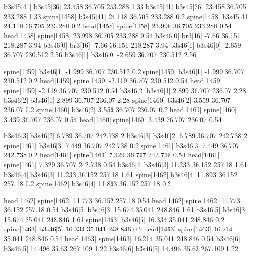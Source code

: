 b3s45[41]    b3s45[36]    23.458    36.705    233.288    1.33
b3s45[41]    b3s45[36]    23.458    36.705    233.288    1.33
spine[1458]    b3s45[41]    24.118    36.705    233.288    0.2
spine[1458]    b3s45[41]    24.118    36.705    233.288    0.2
head[1458]    spine[1458]    23.998    36.705    233.288    0.54
head[1458]    spine[1458]    23.998    36.705    233.288    0.54
b3s46[0]    br3[16]    -7.66    36.151    218.287    3.94
b3s46[0]    br3[16]    -7.66    36.151    218.287    3.94
b3s46[1]    b3s46[0]    -2.659    36.707    230.512    2.56
b3s46[1]    b3s46[0]    -2.659    36.707    230.512    2.56


spine[1459]    b3s46[1]    -1.999    36.707    230.512    0.2
spine[1459]    b3s46[1]    -1.999    36.707    230.512    0.2
head[1459]    spine[1459]    -2.119    36.707    230.512    0.54
head[1459]    spine[1459]    -2.119    36.707    230.512    0.54
b3s46[2]    b3s46[1]    2.899    36.707    236.07    2.28
b3s46[2]    b3s46[1]    2.899    36.707    236.07    2.28
spine[1460]    b3s46[2]    3.559    36.707    236.07    0.2
spine[1460]    b3s46[2]    3.559    36.707    236.07    0.2
head[1460]    spine[1460]    3.439    36.707    236.07    0.54
head[1460]    spine[1460]    3.439    36.707    236.07    0.54


b3s46[3]    b3s46[2]    6.789    36.707    242.738    2
b3s46[3]    b3s46[2]    6.789    36.707    242.738    2
spine[1461]    b3s46[3]    7.449    36.707    242.738    0.2
spine[1461]    b3s46[3]    7.449    36.707    242.738    0.2
head[1461]    spine[1461]    7.329    36.707    242.738    0.54
head[1461]    spine[1461]    7.329    36.707    242.738    0.54
b3s46[4]    b3s46[3]    11.233    36.152    257.18    1.61
b3s46[4]    b3s46[3]    11.233    36.152    257.18    1.61
spine[1462]    b3s46[4]    11.893    36.152    257.18    0.2
spine[1462]    b3s46[4]    11.893    36.152    257.18    0.2


head[1462]    spine[1462]    11.773    36.152    257.18    0.54
head[1462]    spine[1462]    11.773    36.152    257.18    0.54
b3s46[5]    b3s46[3]    15.674    35.041    248.846    1.61
b3s46[5]    b3s46[3]    15.674    35.041    248.846    1.61
spine[1463]    b3s46[5]    16.334    35.041    248.846    0.2
spine[1463]    b3s46[5]    16.334    35.041    248.846    0.2
head[1463]    spine[1463]    16.214    35.041    248.846    0.54
head[1463]    spine[1463]    16.214    35.041    248.846    0.54
b3s46[6]    b3s46[5]    14.496    35.63    267.109    1.22
b3s46[6]    b3s46[5]    14.496    35.63    267.109    1.22


